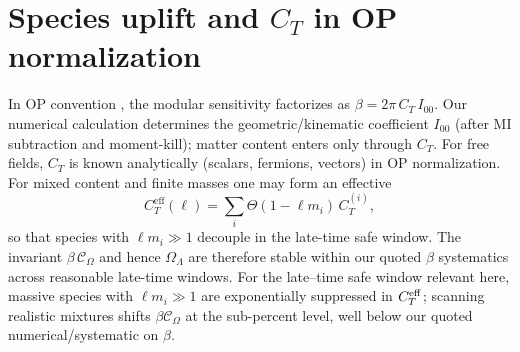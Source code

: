 \documentclass[aps,prd,onecolumn,superscriptaddress,nofootinbib]{revtex4-2}
\begin{document}
\section{Species uplift and \(C_T\) in OP normalization}
\label{app:species}
In OP convention \cite{OsbornPetkou1994}, the modular sensitivity factorizes as \(\beta=2\pi\,C_T\,I_{00}\). Our numerical calculation determines the geometric/kinematic coefficient \(I_{00}\) (after MI subtraction and moment-kill); matter content enters only through \(C_T\). For free fields, \(C_T\) is known analytically (scalars, fermions, vectors) in OP normalization. For mixed content and finite masses one may form an effective
\[
C_T^{\mathrm{eff}}(\ell)=\sum_i \Theta(1-\ell m_i)\,C_T^{(i)},
\]
so that species with \(\ell m_i\gg 1\) decouple in the late-time safe window. The invariant \(\beta\,\mathcal C_\Omega\) and hence \(\Omega_\Lambda\) are therefore stable within our quoted \(\beta\) systematics across reasonable late-time windows. For the late–time safe window relevant here, massive species with $\ell m_i\gg 1$ are exponentially suppressed in $C_T^{\rm eff}$; scanning realistic mixtures shifts $\beta\mathcal C_\Omega$ at the sub-percent level, well below our quoted numerical/systematic on $\beta$.
\end{document}
